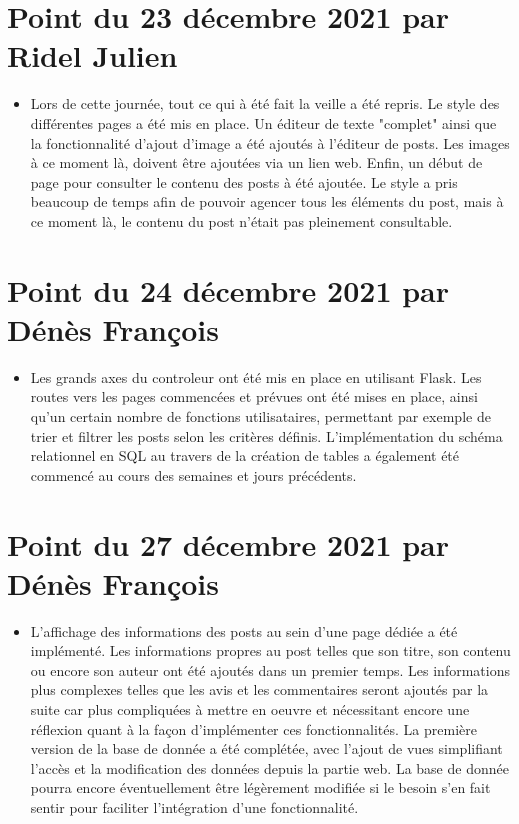\documentclass{article}
\begin{document}
\section{\huge Point du 23 décembre 2021 par Ridel Julien}

\begin{itemize}

    \item \Large Lors de cette journée, tout ce qui à été fait la veille a été repris. Le style des différentes pages a été mis en place. Un éditeur de texte "complet" ainsi que la fonctionnalité d'ajout d'image a été ajoutés à l'éditeur de posts. Les images à ce moment là, doivent être ajoutées via un lien web.
    Enfin, un début de page pour consulter le contenu des posts à été ajoutée. Le style a pris beaucoup de temps afin de pouvoir agencer tous les éléments du post, mais à ce moment là, le contenu du post n'était pas pleinement consultable.
    
\end{itemize}

\section{\huge Point du 24 décembre 2021 par Dénès François}

\begin{itemize}

    \item \Large  Les grands axes du controleur ont été mis en place en utilisant Flask. Les routes vers les pages commencées et prévues ont été mises en place, ainsi qu'un certain nombre de fonctions utilisataires, permettant par exemple de trier et filtrer les posts selon les critères définis. L'implémentation du schéma relationnel en SQL au travers de la création de tables a également été commencé au cours des semaines et jours précédents.
    
\end{itemize}

\section{\huge Point du 27 décembre 2021 par Dénès François}

\begin{itemize}

    \item \Large L'affichage des informations des posts au sein d'une page dédiée a été implémenté. Les informations propres au post telles que son titre, son contenu ou encore son auteur ont été ajoutés dans un premier temps. Les informations plus complexes telles que les avis et les commentaires seront ajoutés par la suite car plus compliquées à mettre en oeuvre et nécessitant encore une réflexion quant à la façon d'implémenter ces fonctionnalités.
                 La première version de la base de donnée a été complétée, avec l'ajout de vues simplifiant l'accès et la modification des données depuis la partie web. La base de donnée pourra encore éventuellement être légèrement modifiée si le besoin s'en fait sentir pour faciliter l'intégration d'une fonctionnalité.
    
\end{itemize}
\end{document}
